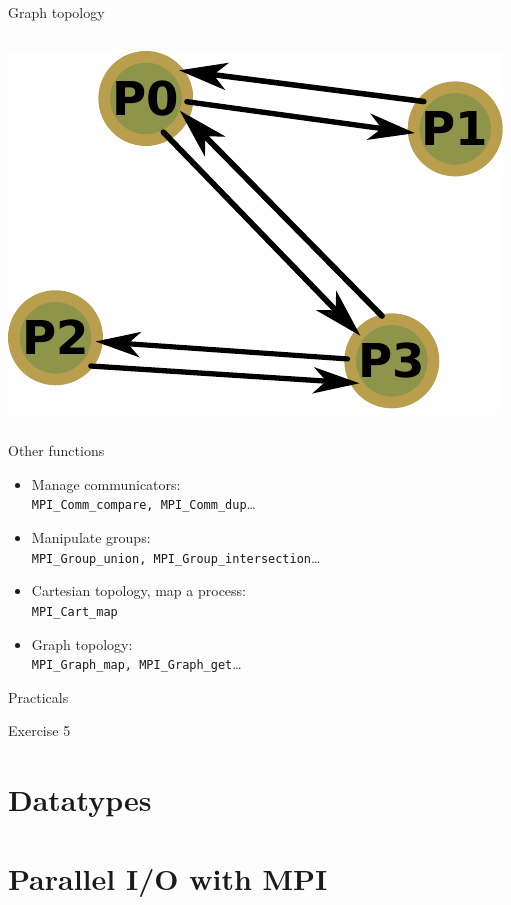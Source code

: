 \documentclass[aspectratio=43]{beamer}
\begin{document}
\begin{frame}[fragile]{Graph topology}
\begin{columns}
    \begin{column}{0.2\paperwidth}
\includegraphics[scale=0.36]{04.MPI_Topo/graph.pdf}
    \end{column}
\end{columns}

\end{frame}


\begin{frame}[fragile]{Other functions}
\begin{itemize}
    \item Manage communicators:\\\hspace{1cm}\verb+MPI_Comm_compare, MPI_Comm_dup+\ldots
    \item Manipulate groups:\\\hspace{1cm}\verb+MPI_Group_union, MPI_Group_intersection+\ldots
    \item Cartesian topology, map a process:\\\hspace{1cm}\verb+MPI_Cart_map+
    \item Graph topology:\\\hspace{1cm}\verb+MPI_Graph_map, MPI_Graph_get+\ldots
\end{itemize}
\end{frame}


\begin{frame}{Practicals}
    \begin{brown2block}{Exercise 5}
    \end{brown2block}
\end{frame}



\section{Datatypes}
\section{Parallel I/O with MPI}

\end{document}
